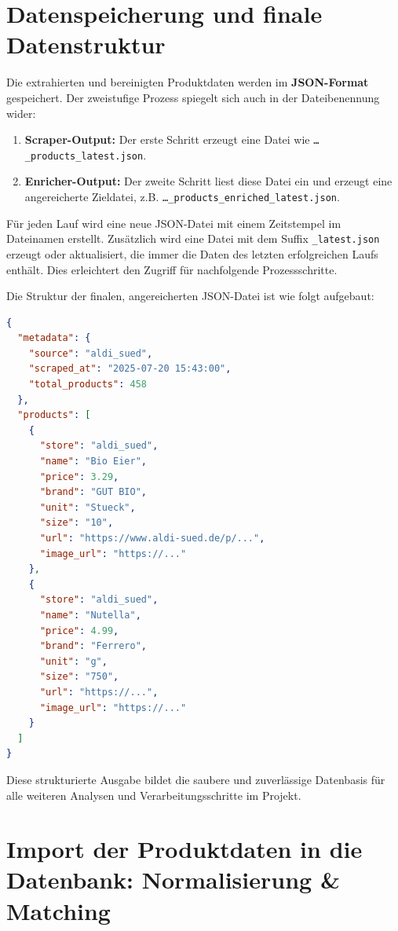 \documentclass[12pt, a4paper]{report} %
\begin{document}
\section{Datenspeicherung und finale Datenstruktur}
\label{sec:scraping_datenspeicherung}
Die extrahierten und bereinigten Produktdaten werden im \textbf{JSON-Format} gespeichert. Der zweistufige Prozess spiegelt sich auch in der Dateibenennung wider:
\begin{enumerate}
    \item \textbf{Scraper-Output:} Der erste Schritt erzeugt eine Datei wie \texttt{\ldots\_products\_latest.json}.
    \item \textbf{Enricher-Output:} Der zweite Schritt liest diese Datei ein und erzeugt eine angereicherte Zieldatei, z.B. \texttt{\ldots\_products\_enriched\_latest.json}.
\end{enumerate}

Für jeden Lauf wird eine neue JSON-Datei mit einem Zeitstempel im Dateinamen erstellt. Zusätzlich wird eine Datei mit dem Suffix \texttt{\_latest.json} erzeugt oder aktualisiert, die immer die Daten des letzten erfolgreichen Laufs enthält. Dies erleichtert den Zugriff für nachfolgende Prozessschritte.

Die Struktur der finalen, angereicherten JSON-Datei ist wie folgt aufgebaut:
\begin{lstlisting}[language=JSON, caption={Beispielhafte JSON-Struktur der finalen Ausgabedatei}]
{
  "metadata": {
    "source": "aldi_sued",
    "scraped_at": "2025-07-20 15:43:00",
    "total_products": 458
  },
  "products": [
    {
      "store": "aldi_sued",
      "name": "Bio Eier",
      "price": 3.29,
      "brand": "GUT BIO",
      "unit": "Stueck",
      "size": "10",
      "url": "https://www.aldi-sued.de/p/...",
      "image_url": "https://..."
    },
    {
      "store": "aldi_sued",
      "name": "Nutella",
      "price": 4.99,
      "brand": "Ferrero",
      "unit": "g",
      "size": "750",
      "url": "https://...",
      "image_url": "https://..."
    }
  ]
}
\end{lstlisting}
Diese strukturierte Ausgabe bildet die saubere und zuverlässige Datenbasis für alle weiteren Analysen und Verarbeitungsschritte im Projekt.

\section{Import der Produktdaten in die Datenbank: Normalisierung \& Matching}
\end{document}

